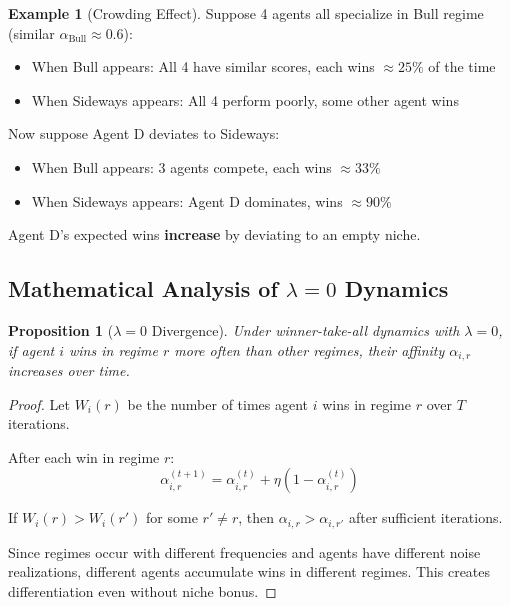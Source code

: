 \documentclass[11pt,a4paper]{article}
\theoremstyle{definition}
\newtheorem{example}{Example}[section]
\theoremstyle{plain}
\newtheorem{proposition}{Proposition}[section]
\begin{document}
\begin{example}[Crowding Effect]
Suppose 4 agents all specialize in Bull regime (similar $\alpha_{\text{Bull}} \approx 0.6$):
\begin{itemize}
    \item When Bull appears: All 4 have similar scores, each wins $\approx 25\%$ of the time
    \item When Sideways appears: All 4 perform poorly, some other agent wins
\end{itemize}

Now suppose Agent D deviates to Sideways:
\begin{itemize}
    \item When Bull appears: 3 agents compete, each wins $\approx 33\%$
    \item When Sideways appears: Agent D dominates, wins $\approx 90\%$
\end{itemize}

Agent D's expected wins \textbf{increase} by deviating to an empty niche.
\end{example}

\subsection{Mathematical Analysis of $\lambda = 0$ Dynamics}

\begin{proposition}[$\lambda = 0$ Divergence]
Under winner-take-all dynamics with $\lambda = 0$, if agent $i$ wins in regime $r$ more often than other regimes, their affinity $\alpha_{i,r}$ increases over time.
\end{proposition}

\begin{proof}
Let $W_i(r)$ be the number of times agent $i$ wins in regime $r$ over $T$ iterations.

After each win in regime $r$:
\begin{equation}
\alpha_{i,r}^{(t+1)} = \alpha_{i,r}^{(t)} + \eta(1 - \alpha_{i,r}^{(t)})
\end{equation}

If $W_i(r) > W_i(r')$ for some $r' \neq r$, then $\alpha_{i,r} > \alpha_{i,r'}$ after sufficient iterations.

Since regimes occur with different frequencies and agents have different noise realizations, different agents accumulate wins in different regimes. This creates differentiation even without niche bonus.
\end{proof}
\end{document}

